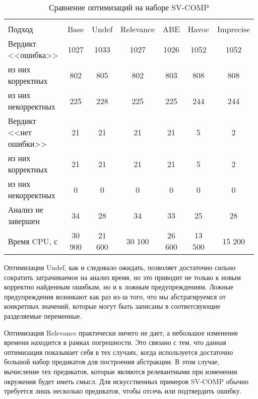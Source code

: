   \begin{table}[h]\footnotesize \centering
    \caption{Сравнение оптимизаций на наборе SV-COMP}
  	\label{table-sv-comp-opt}
    \begin{tabular}{ | l | c | c | c | c | c | c | }
      \hline
      		& 		\multicolumn{6}{c|}{\theory}  \\
      Подход         				& Base 	& Undef 	& Relevance & ABE 	& Havoc 	&  Imprecise \\ \hline
      Вердикт <<ошибка>> 				& 1027  & 1033  	& 1027      & 1026  & 1052     	& 1052       \\ 
  \hspace{0.5cm} из них корректных 	& 802 	& 805 		& 802     	& 803   & 808    	& 808     	\\ 
  \hspace{0.5cm} из них некорректных & 225 	& 228 		& 225     	& 225  	& 244      	& 244       \\ \hline
      Вердикт <<нет ошибки>>  		& 21    & 21    	& 21    	& 21   	& 5     	& 2       \\ 
  \hspace{0.5cm} из них корректных 	& 21 	& 21    	& 21     	& 21   	& 5     	& 2       \\
  \hspace{0.5cm} из них некорректных & 0 	& 0    		& 0     	& 0   	& 0     	& 0       \\ \hline
      Анализ не завершен       		& 34     & 28     	& 34     	& 33   	& 25     	& 28      	\\ \hline
      Время CPU, с   				& 30 900 & 21 600 	& 30 100  	& 26 600 & 13 500   & 15 200     	\\ 
      \hline
    \end{tabular}
  \end{table}

Оптимизация Undef, как и следовало ожидать, позволяет достаточно сильно сократить затрачиваемое на анализ время, но это приводит не только к новым корректно найденным ошибкам, но и к ложным предупреждениям.
Ложные предупреждения возникают как раз из-за того, что мы абстрагируемся от конкретных значений, которые могут быть записаны в соответсвующие разделяемые переменные. 

Оптимизация Relevance практически ничего не дает, а небольшое изменение времени находится в рамках погрешности. 
Это связано с тем, что данная оптимизация показывает себя в тех случаях, когда используется достаточно большой набор предикатов для построения абстракции.
В этом случае, вычисление тех предикатов, которые являются релевантными при изменении окружения будет иметь смысл.
Для искусственных примеров SV-COMP обычно требуется лишь несколько предикатов, чтобы отсечь или подтвердить ошибку.

